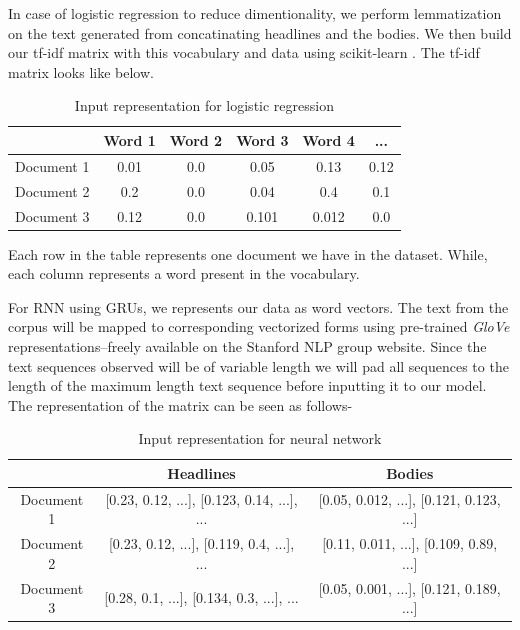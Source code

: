 \documentclass[11.5pt]{article}
\begin{document}
 
In case of logistic regression to reduce dimentionality, we perform lemmatization on the text generated from concatinating headlines and the bodies. 
We then build our tf-idf matrix with this vocabulary and data using scikit-learn \cite{scikit-learn}. The tf-idf matrix looks like below.

\begin{table}[h]
  \centering
  \begin{tabular} 
    {|c|c|c|c|c|c|}
    \hline
    & Word 1 & Word 2 & Word 3 & Word 4 & ... \\
    \hline
    Document 1 & 0.01 & 0.0 & 0.05 & 0.13 & 0.12 \\
    \hline
    Document 2 & 0.2 & 0.0 & 0.04 & 0.4 & 0.1 \\
    \hline
    Document 3  & 0.12 & 0.0 & 0.101 & 0.012 & 0.0 \\
    \hline
  \end{tabular}
  \caption{Input representation for logistic regression}
\end{table}

Each row in the table represents one document we have in the dataset. While, each column represents a word present in the vocabulary.

For RNN using GRUs, we represents our data as word vectors. The text from the corpus will be mapped to corresponding vectorized
forms using  pre-trained \textit{GloVe} 
representations--freely available on the Stanford NLP group website\cite{Bird:2009:NLP:1717171,pennington2014glove}. 
Since the text sequences observed will be of variable length we will pad all 
sequences to the length of the maximum length text sequence before inputting 
it to our model. The representation of the matrix can be seen as follows-

\begin{table}[h]
  \centering
  \begin{tabular} 
    {|c|c|c|}
    \hline
    & Headlines & Bodies \\
    \hline
    Document 1 & [0.23, 0.12, ...], [0.123, 0.14, ...], ... & [0.05, 0.012, ...], [0.121, 0.123, ...] \\
    \hline
    Document 2 & [0.23, 0.12, ...], [0.119, 0.4, ...], ... & [0.11, 0.011, ...], [0.109, 0.89, ...] \\
    \hline
    Document 3 & [0.28, 0.1, ...], [0.134, 0.3, ...], ... & [0.05, 0.001, ...], [0.121, 0.189, ...] \\
    \hline
  \end{tabular}
  \caption{Input representation for neural network}
\end{table}
\end{document}
